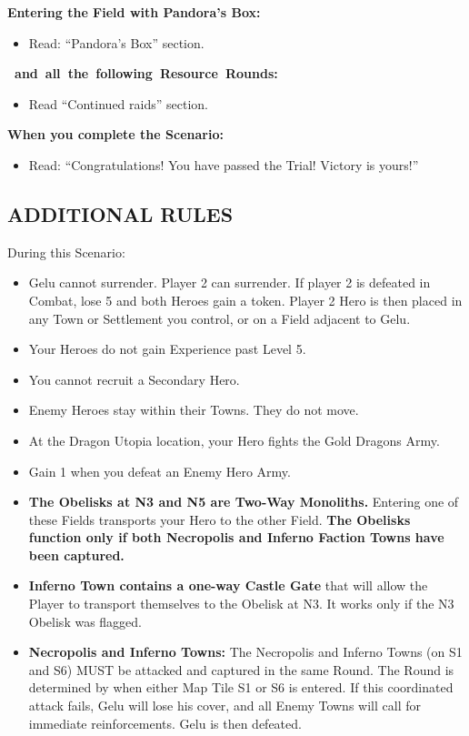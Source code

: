 \begin{multicols*}{2}
\textbf{Entering the Field with Pandora's Box:}
\begin{itemize}
  \item Read: ``Pandora's Box'' section.
\end{itemize}

\textbf{\mbox{ and all the following Resource Rounds:}}
\begin{itemize}
  \item Read ``Continued raids'' section.
\end{itemize}

\textbf{When you complete the Scenario:}
\begin{itemize}
  \item Read: ``Congratulations! You have passed the Trial! Victory is yours!''
\end{itemize}

\columnbreak

\subsection*{\MakeUppercase{Additional Rules}}

During this Scenario:

\begin{itemize}
    \item Gelu cannot surrender.
      Player 2 can surrender.
      If player 2 is defeated in Combat, lose 5  and both Heroes gain a  token.
      Player 2 Hero is then placed in any Town or Settlement you control, or on a Field adjacent to Gelu.
    \item Your Heroes do not gain Experience past Level 5.
    \item You cannot recruit a Secondary Hero.
    \item Enemy Heroes stay within their Towns. They do not move.
    \item At the Dragon Utopia location, your Hero fights the Gold Dragons Army.
    \item Gain 1  when you defeat an Enemy Hero Army.
    \item \textbf{The Obelisks at N3 and N5 are Two-Way Monoliths.}
      Entering one of these Fields transports your Hero to the other Field. \textbf{The Obelisks function only if both Necropolis and Inferno Faction Towns have been captured.}
    \item \textbf{Inferno Town contains a one-way Castle Gate} that will allow the Player to transport themselves to the Obelisk at N3. It works only if the N3 Obelisk was flagged.
  \item \textbf{Necropolis and Inferno Towns:} The Necropolis and Inferno Towns (on S1 and S6) MUST be attacked and captured in the same Round.
    The Round is determined by when either Map Tile S1 or S6 is entered.
    If this coordinated attack fails, Gelu will lose his cover, and all Enemy Towns will call for immediate reinforcements.
    Gelu is then defeated.
\end{itemize}

\end{multicols*}

